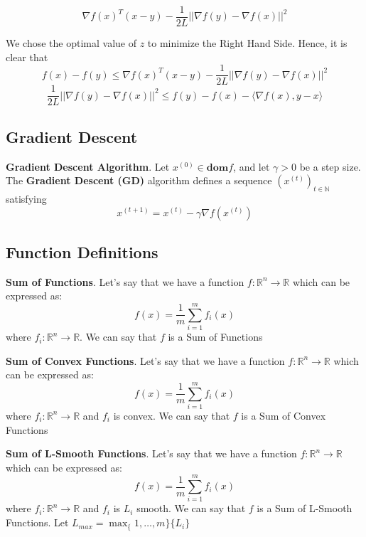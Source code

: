 \begin{equation}
    \nabla f(x)^T (x - y) - \frac{1}{2L} ||\nabla f(y) - \nabla f(x)||^2
\end{equation}

We chose the optimal value of $z$ to minimize the Right Hand Side. Hence, it is clear that 
\begin{equation}
    f(x) - f(y) \leq \nabla f(x)^T (x - y) - \frac{1}{2L} ||\nabla f(y) - \nabla f(x)||^2
\end{equation}
\begin{equation}
    \frac{1}{2L} ||\nabla f(y) - \nabla f(x)||^2 \leq f(y) - f(x) - \langle \nabla f(x), y - x \rangle
\end{equation}

\subsection{Gradient Descent}
\noindent \textbf{Gradient Descent Algorithm}. Let $x^{(0)} \in \textbf{dom} f$, and let $\gamma > 0$ be a step size. The \textbf{Gradient Descent (GD)} algorithm defines a sequence $(x^{(t)})_{t \in \mathbb{N}}$ satisfying
\begin{equation}
    x^{(t + 1)}  = x^{(t)} - \gamma \nabla f(x^{(t)})
\end{equation}

\subsection{Function Definitions}
\noindent \textbf{Sum of Functions}. Let's say that we have a function $f: \mathbb{R}^n \rightarrow \mathbb{R}$ which can be expressed as: 
\begin{equation}
    f(x) = \frac{1}{m} \sum_{i=1}^{m} f_i(x)
\end{equation}
where $f_i: \mathbb{R}^n \rightarrow \mathbb{R}$. We can say that $f$ is a Sum of Functions \newline 

\noindent \textbf{Sum of Convex Functions}. Let's say that we have a function $f: \mathbb{R}^n \rightarrow \mathbb{R}$ which can be expressed as: 
\begin{equation}
    f(x) = \frac{1}{m} \sum_{i=1}^{m} f_i(x)
\end{equation}
where $f_i: \mathbb{R}^n \rightarrow \mathbb{R}$ and $f_i$ is convex. We can say that $f$ is a Sum of Convex Functions \newline 

\noindent \textbf{Sum of L-Smooth Functions}. Let's say that we have a function $f: \mathbb{R}^n \rightarrow \mathbb{R}$ which can be expressed as: 
\begin{equation}
    f(x) = \frac{1}{m} \sum_{i=1}^{m} f_i(x)
\end{equation}
where $f_i: \mathbb{R}^n \rightarrow \mathbb{R}$ and $f_i$ is $L_i$ smooth. We can say that $f$ is a Sum of L-Smooth Functions. Let $L_{max} = \max_\{1, \dots, m\} \{L_i\}$

